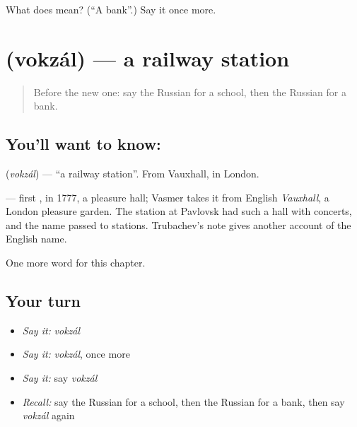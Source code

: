 \begin{tcolorbox}[breakable,colback=teal!4,colframe=teal!35!black,title={Before you move on}]
What does  mean? (\textquotedblleft{}A bank\textquotedblright{}.) Say it once more.
\end{tcolorbox}
\section[\texorpdfstring{\ru{вокзал} (vokzál)}{вокзал (vokzál)}]{ (vokzál) — a railway station}

\label{lesson:RU-C78-station}



\begin{quote}
Before the new one: say the Russian for a school, then the Russian for a bank.
\end{quote}

\subsection*{You'll want to know: }
\textbf{} (\emph{vokzál}) — \textquotedblleft{}a railway station\textquotedblright{}. From Vauxhall, in London.

\begin{cousinweb}
\textbf{} — first \emph{}, in 1777, a pleasure hall; Vasmer takes it from English \emph{Vauxhall}, a London pleasure garden. The station at Pavlovsk had such a hall with concerts, and the name passed to stations. Trubachev's note gives another account of the English name.
\end{cousinweb}

\begin{grammarlens}[title={What you've built}]
One more word for this chapter.
\end{grammarlens}

\subsection*{Your turn}
\begin{itemize}
\raggedright
  \item \emph{Say it:} \emph{vokzál}
  \item \emph{Say it:} \emph{vokzál}, once more
  \item \emph{Say it:} say \emph{vokzál}
  \item \emph{Recall:} say the Russian for a school, then the Russian for a bank, then say \emph{vokzál} again
\end{itemize}

